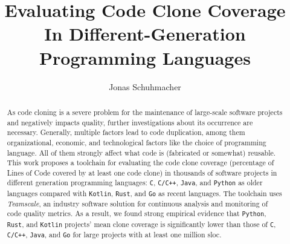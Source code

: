 \documentclass[runningheads]{llncs}
\def\teamscale{\textit{Teamscale}}
\begin{document}
%
\title{Evaluating Code Clone Coverage In Different-Generation Programming Languages}
%
%
%
\author{Jonas Schuhmacher}
%
\maketitle %
%
%
\begin{abstract}
As code cloning is a severe problem for the maintenance of large-scale software projects and negatively impacts quality, further investigations about its occurrence are necessary. Generally, multiple factors lead to code duplication, among them organizational, economic, and technological factors like the choice of programming language. All of them strongly affect what code is (fabricated or somewhat) reusable.
This work proposes a toolchain for evaluating the code clone coverage (percentage of Lines of Code covered by at least one code clone) in thousands of software projects in different generation programming languages: \texttt{C}, \texttt{C/C++}, \texttt{Java}, and \texttt{Python} as older languages compared with \texttt{Kotlin}, \texttt{Rust}, and \texttt{Go} as recent languages.
The toolchain uses \teamscale{}, an industry software solution for continuous analysis and monitoring of code quality metrics.
As a result, we found strong empirical evidence that \texttt{Python}, \texttt{Rust}, and \texttt{Kotlin} projects' mean clone coverage is significantly lower than those of \texttt{C}, \texttt{C/C++}, \texttt{Java}, and \texttt{Go} for large projects with at least one million \acl{sloc}.

\end{abstract}
%
%







%
%
%
%
%


%
\end{document}
